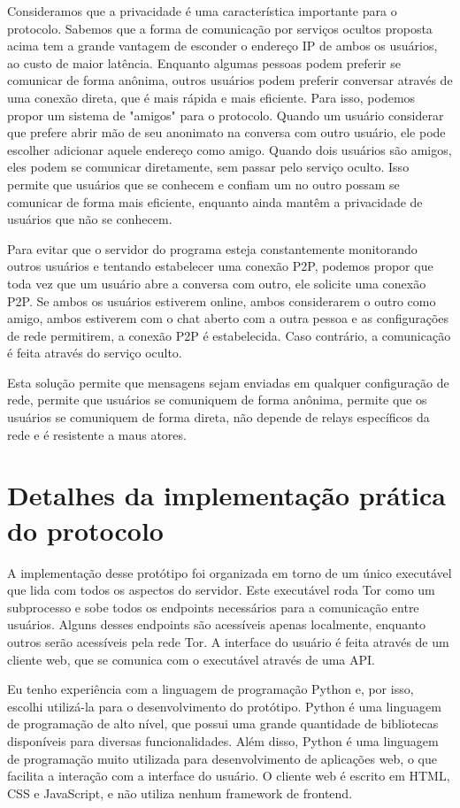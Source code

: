 Consideramos que a privacidade é uma característica importante para o protocolo. Sabemos que a forma de comunicação por serviços ocultos proposta acima tem a grande vantagem de esconder o endereço IP de ambos os usuários, ao custo de maior latência. Enquanto algumas pessoas podem preferir se comunicar de forma anônima, outros usuários podem preferir conversar através de uma conexão direta, que é mais rápida e mais eficiente. Para isso, podemos propor um sistema de "amigos" para o protocolo. Quando um usuário considerar que prefere abrir mão de seu anonimato na conversa com outro usuário, ele pode escolher adicionar aquele endereço como amigo. Quando dois usuários são amigos, eles podem se comunicar diretamente, sem passar pelo serviço oculto. Isso permite que usuários que se conhecem e confiam um no outro possam se comunicar de forma mais eficiente, enquanto ainda mantêm a privacidade de usuários que não se conhecem.

Para evitar que o servidor do programa esteja constantemente monitorando outros usuários e tentando estabelecer uma conexão P2P, podemos propor que toda vez que um usuário abre a conversa com outro, ele solicite uma conexão P2P. Se ambos os usuários estiverem online, ambos considerarem o outro como amigo, ambos estiverem com o chat aberto com a outra pessoa e as configurações de rede permitirem, a conexão P2P é estabelecida. Caso contrário, a comunicação é feita através do serviço oculto.

Esta solução permite que mensagens sejam enviadas em qualquer configuração de rede, permite que usuários se comuniquem de forma anônima, permite que os usuários se comuniquem de forma direta, não depende de relays específicos da rede e é resistente a maus atores.

\section{Detalhes da implementação prática do protocolo}

A implementação desse protótipo foi organizada em torno de um único executável que lida com todos os aspectos do servidor. Este executável roda Tor como um subprocesso e sobe todos os endpoints necessários para a comunicação entre usuários. Alguns desses endpoints são acessíveis apenas localmente, enquanto outros serão acessíveis pela rede Tor. A interface do usuário é feita através de um cliente web, que se comunica com o executável através de uma API.

Eu tenho experiência com a linguagem de programação Python e, por isso, escolhi utilizá-la para o desenvolvimento do protótipo. Python é uma linguagem de programação de alto nível, que possui uma grande quantidade de bibliotecas disponíveis para diversas funcionalidades. Além disso, Python é uma linguagem de programação muito utilizada para desenvolvimento de aplicações web, o que facilita a interação com a interface do usuário. O cliente web é escrito em HTML, CSS e JavaScript, e não utiliza nenhum framework de frontend.

